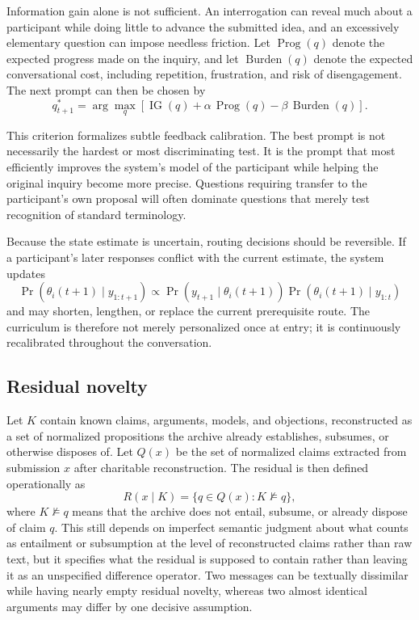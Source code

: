 \documentclass[11pt]{article}
\begin{document}
Information gain alone is not sufficient. An interrogation can reveal much about a participant while doing little to advance the submitted idea, and an excessively elementary question can impose needless friction. Let $\operatorname{Prog}(q)$ denote the expected progress made on the inquiry, and let $\operatorname{Burden}(q)$ denote the expected conversational cost, including repetition, frustration, and risk of disengagement. The next prompt can then be chosen by
\[
q_{t+1}^{*}
=
\arg\max_q
\left[
\operatorname{IG}(q)
+
\alpha\,\operatorname{Prog}(q)
-
\beta\,\operatorname{Burden}(q)
\right].
\]

This criterion formalizes subtle feedback calibration. The best prompt is not necessarily the hardest or most discriminating test. It is the prompt that most efficiently improves the system's model of the participant while helping the original inquiry become more precise. Questions requiring transfer to the participant's own proposal will often dominate questions that merely test recognition of standard terminology.

Because the state estimate is uncertain, routing decisions should be reversible. If a participant's later responses conflict with the current estimate, the system updates
\[
\Pr\!\left(\theta_i(t+1)\mid y_{1:t+1}\right)
\propto
\Pr\!\left(y_{t+1}\mid\theta_i(t+1)\right)
\Pr\!\left(\theta_i(t+1)\mid y_{1:t}\right)
\]
and may shorten, lengthen, or replace the current prerequisite route. The curriculum is therefore not merely personalized once at entry; it is continuously recalibrated throughout the conversation.

\subsection{Residual novelty}

Let $K$ contain known claims, arguments, models, and objections, reconstructed as a set of normalized propositions the archive already establishes, subsumes, or otherwise disposes of. Let $Q(x)$ be the set of normalized claims extracted from submission $x$ after charitable reconstruction. The residual is then defined operationally as
\[
R(x \mid K) = \{ q \in Q(x) : K \nvDash q \},
\]
where $K \nvDash q$ means that the archive does not entail, subsume, or already dispose of claim $q$. This still depends on imperfect semantic judgment about what counts as entailment or subsumption at the level of reconstructed claims rather than raw text, but it specifies what the residual is supposed to contain rather than leaving it as an unspecified difference operator. Two messages can be textually dissimilar while having nearly empty residual novelty, whereas two almost identical arguments may differ by one decisive assumption.
\end{document}
